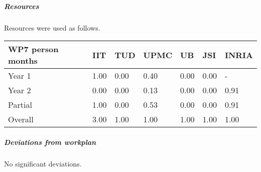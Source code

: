 

\subparagraph{Resources}

Resources were used as follows.

\begin{center}
\begin{tabular}{|C{1.5cm}|C{1.5cm}|C{1.5cm}|C{2cm}|C{2cm}|C{2cm}|C{2cm}|}
\hline
\footnotesize \textbf{WP7 person months}& \footnotesize \textbf{IIT}&\footnotesize \textbf{TUD}&\footnotesize \textbf{UPMC}& \footnotesize \textbf{UB} &\footnotesize \textbf{JSI} & \footnotesize \textbf{INRIA} \\ \hline
\footnotesize Year 1 &  1.00 & 0.00 & 0.40 & 0.00 & 0.00 & - \\  \hline
\footnotesize Year 2 &  0.00 & 0.00 & 0.13 & 0.00 & 0.00 & 0.91 \\  \hline
\footnotesize Partial & 1.00 & 0.00 & 0.53 & 0.00 & 0.00 & 0.91 \\ \hline \hline
\footnotesize Overall & 3.00 & 1.00 & 1.00 & 1.00 & 1.00 & 1.00 \\ \hline
\end{tabular}
\end{center}

\subparagraph{Deviations from workplan} 
No significant deviations. 